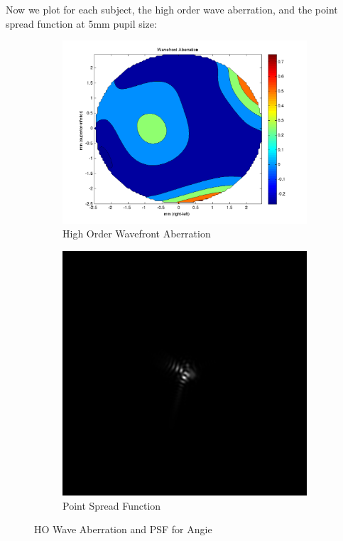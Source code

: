 \documentclass{article}
\begin{document}
Now we plot for each subject, the high order wave aberration, and the point spread function at 5mm pupil size:

\begin{figure}[H]
\begin{subfigure}{.5\textwidth}
  \centering
  \includegraphics[width=1\linewidth, keepaspectratio]{Angie_WFA.png}
  \caption{High Order Wavefront Aberration}
  \label{fig:angiehowa}
\end{subfigure}%
\begin{subfigure}{.5\textwidth}
  \centering
  \includegraphics[width=.8\linewidth]{Angie_PSF.png}
  \caption{Point Spread Function}
  \label{fig:angiepsf}
\end{subfigure}
\caption{HO Wave Aberration and PSF for Angie}
\label{fig:angie}
\end{figure}
\end{document}
